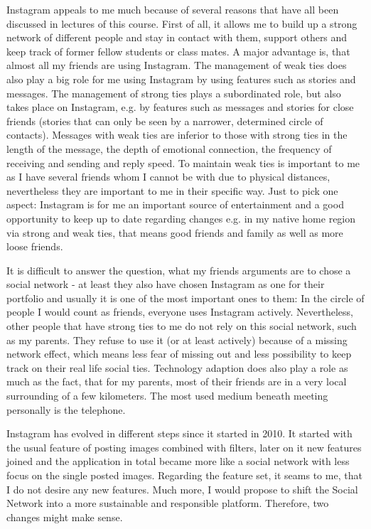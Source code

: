 \documentclass[11pt,letterpaper]{article}
\begin{document}
Instagram appeals to me much because of several reasons that have all been discussed in lectures of this course. First of all, it allows me to build up a strong network of different people and stay in contact with them, support others and keep track of former fellow students or class mates. A major advantage is, that almost all my friends are using Instagram. The management of weak ties does also play a big role for me using Instagram by using features such as stories and messages. The management of strong ties plays a subordinated role, but also takes place on Instagram, e.g. by features such as messages and stories for close friends (stories that can only be seen by a narrower, determined circle of contacts). Messages with weak ties are inferior to those with strong ties in the length of the message, the depth of emotional connection, the frequency of receiving and sending and reply speed. To maintain weak ties is important to me as I have several friends whom I cannot be with due to physical distances, nevertheless they are important to me in their specific way. Just to pick one aspect: Instagram is for me an important source of entertainment and a good opportunity to keep up to date regarding changes e.g. in my native home region via strong and weak ties, that means good friends and family as well as more loose friends.

It is difficult to answer the question, what my friends arguments are to chose a social network - at least they also have chosen Instagram as one for their portfolio and usually it is one of the most important ones to them: In the circle of people I would count as friends, everyone uses Instagram actively. Nevertheless, other people that have strong ties to me do not rely on this social network, such as my parents. They refuse to use it (or at least actively) because of a missing network effect, which means less fear of missing out and less possibility to keep track on their real life social ties. Technology adaption does also play a role as much as the fact, that for my parents, most of their friends are in a very local surrounding of a few kilometers. The most used medium beneath meeting personally is the telephone.

Instagram has evolved in different steps since it started in 2010. It started with the usual feature of posting images combined with filters, later on it new features joined and the application in total became more like a social network with less focus on the single posted images. Regarding the feature set, it seams to me, that I do not desire any new features. Much more, I would propose to shift the Social Network into a more sustainable and responsible platform. Therefore, two changes might make sense.
\end{document}
